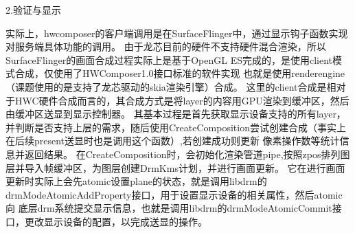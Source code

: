 2.验证与显示

实际上，hwcomposer的客户端调用是在SurfaceFlinger中，通过显示钩子函数实现对服务端具体功能的调用。
由于龙芯目前的硬件不支持硬件混合渲染，所以SurfaceFlinger的画面合成过程实际上是基于OpenGL ES完成的，是使用client模式合成，仅使用了HWComposer1.0接口标准的软件实现
也就是使用renderengine（课题使用的是支持了龙芯驱动的skia渲染引擎）合成。
这里的client合成是相对于HWC硬件合成而言的，其合成方式是将layer的内容用GPU渲染到缓冲区，然后由缓冲区送显到显示控制器。
其基本过程是首先获取显示设备支持的所有layer，并判断是否支持上层的需求，随后使用CreateComposition尝试创建合成（事实上在后续present送显时也是调用这个函数）,若创建成功则更新
像素操作数等统计信息并返回结果。
在CreateComposition时，会初始化渲染管道pipe,按照zpos排列图层并导入帧缓冲区，为图层创建DrmKms计划，并进行画面更新。
它在进行画面更新时实际上会先atomic设置plane的状态，就是调用libdrm的drmModeAtomicAddProperty接口，用于设置显示设备的相关属性，然后atomic向
底层drm系统提交显示信息，也就是调用libdrm的drmModeAtomicCommit接口，更改显示设备的配置，以完成送显的操作。








